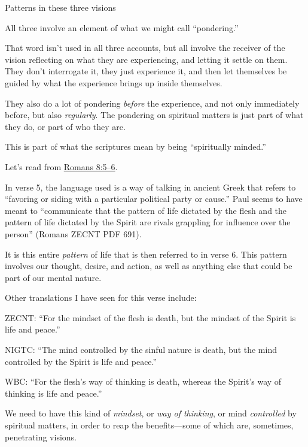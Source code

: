 \begin{compactitem}
			\item Patterns in these three visions
				\begin{compactitem}
					\item All three involve an element of what we might call ``pondering.''
						\begin{compactitem}
							\item That word isn't used in all three accounts, but all involve the receiver of the vision reflecting on what they are experiencing, and letting it settle on them. They don't interrogate it, they just experience it, and then let themselves be guided by what the experience brings up inside themselves.
							\item They also do a lot of pondering \textit{before} the experience, and not only immediately before, but also \textit{regularly}. The pondering on spiritual matters is just part of what they do, or part of who they are.
							\item This is part of what the scriptures mean by being ``spiritually minded.''
							\item Let's read from \hyperref[ROMANS-8-5]{Romans 8:5--6}.
							\item In verse 5, the language used is a way of talking in ancient Greek that refers to ``favoring or siding with a particular political party or cause.'' Paul seems to have meant to ``communicate that the pattern of life dictated by the flesh and the pattern of life dictated by the Spirit are rivals grappling for influence over the person'' (Romans ZECNT PDF 691).
							\item It is this entire \textit{pattern} of life that is then referred to in verse 6. This pattern involves our thought, desire, and action, as well as anything else that could be part of our mental nature.
							\item Other translations I have seen for this verse include:
								\begin{compactitem}
									\item ZECNT: ``For the mindset of the flesh is death, but the mindset of the Spirit is life and peace.''
									\item NIGTC: ``The mind controlled by the sinful nature is death, but the mind controlled by the Spirit is life and peace.''
									\item WBC: ``For the flesh's way of thinking is death, whereas the Spirit's way of thinking is life and peace.''
								\end{compactitem}
							\item We need to have this kind of \textit{mindset}, or \textit{way of thinking}, or mind \textit{controlled} by spiritual matters, in order to reap the benefits---some of which are, sometimes, penetrating visions.

\end{compactitem}
\end{compactitem}
\end{compactitem}
